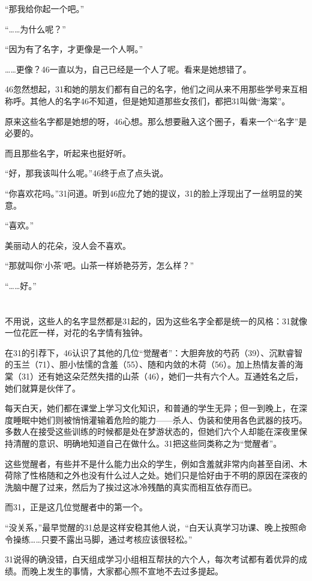 “那我给你起一个吧。”

“……为什么呢？”

“因为有了名字，才更像是一个人啊。”

……更像？46一直以为，自己已经是一个人了呢。看来是她想错了。

46忽然想起，31和她的朋友们都有自己的名字，他们之间从来不用那些学号来互相称呼。其他人的名字46不知道，但是她知道那些女孩们，都把31叫做“海棠”。

原来这些名字都是她想的呀，46心想。那么想要融入这个圈子，看来一个“名字”是必要的。

而且那些名字，听起来也挺好听。

“好，那我该叫什么呢。”46终于点了点头说。

“你喜欢花吗。”31问道。听到46应允了她的提议，31的脸上浮现出了一丝明显的笑意。

“喜欢。”

美丽动人的花朵，没人会不喜欢。

“那就叫你‘小茶’吧。山茶一样娇艳芬芳，怎么样？”

“……好。”

\section*{}

不用说，这些人的名字显然都是31起的，因为这些名字全都是统一的风格：31就像一位花匠一样，对花的名字情有独钟。

在31的引荐下，46认识了其他的几位“觉醒者”：大胆奔放的芍药（39）、沉默睿智的玉兰（71）、胆小怯懦的含羞（55）、随和内敛的木荷（56）。加上热情友善的海棠（31）还有她这朵茫然失措的山茶（46），她们一共有六个人。互通姓名之后，她们就算是伙伴了。 

每天白天，她们都在课堂上学习文化知识，和普通的学生无异；但一到晚上，在深度睡眠中她们则被悄悄灌输着危险的能力——杀人、伪装和使用各色武器的技巧。多数人在接受这些训练的时候都是处在梦游状态的，但她们六个人却能在深夜里保持清醒的意识、明确地知道自己在做什么。31把这些同类称之为“觉醒者”。

这些觉醒者，有些并不是什么能力出众的学生，例如含羞就非常内向甚至自闭、木荷除了性格随和之外也没有什么过人之处。她们只是恰好由于不明的原因在深夜的洗脑中醒了过来，然后为了挨过这冰冷残酷的真实而相互依存而已。

而31，正是这几位觉醒者中的第一个。

“没关系，”最早觉醒的31总是这样安稳其他人说，“白天认真学习功课、晚上按照命令操练……只要不露出马脚，通过考核应该很轻松。”

31说得的确没错，白天组成学习小组相互帮扶的六个人，每次考试都有着优异的成绩。而晚上发生的事情，大家都心照不宣地不去过多提起。

